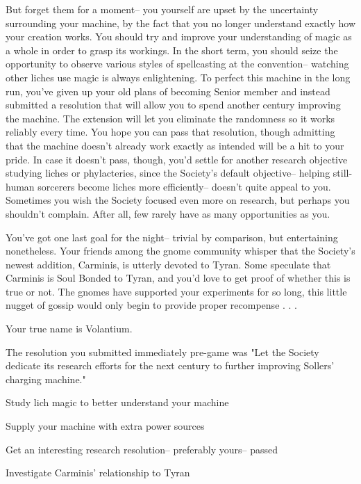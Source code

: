 \documentclass[char]{Sel}
\begin{document}
But forget them for a moment-- you yourself are upset by the uncertainty surrounding your machine, by the fact that you no longer understand exactly how your creation works. You should try and improve your understanding of magic as a whole in order to grasp its workings. In the short term, you should seize the opportunity to observe various styles of spellcasting at the convention-- watching other liches use magic is always enlightening. To perfect this machine in the long run, you've given up your old plans of becoming Senior member and instead submitted a resolution that will allow you to spend another century improving the machine. The extension will let you eliminate the randomness so it works reliably every time. You hope you can pass that resolution, though admitting that the machine doesn't already work exactly as intended will be a hit to your pride. In case it doesn't pass, though, you'd settle for another research objective studying liches or phylacteries, since the Society’s default objective-- helping still-human sorcerers become liches more efficiently-- doesn’t quite appeal to you. Sometimes you wish the Society focused even more on research, but perhaps you shouldn't complain. After all, few rarely have as many opportunities as you.

You've got one last goal for the night-- trivial by comparison, but entertaining nonetheless. Your friends among the gnome community whisper that the Society's newest addition, Carminis, is utterly devoted to Tyran. Some speculate that Carminis is Soul Bonded to Tyran, and you'd love to get proof of whether this is true or not. The gnomes have supported your experiments for so long, this little nugget of gossip would only begin to provide proper recompense . . .
\begin{itemz}[Notes]
  \item Your true name is Volantium.
  \item The resolution you submitted immediately pre-game was "Let the Society dedicate its research efforts for the next century to further improving Sollers' charging machine."
    \end{itemz}

 \begin{itemz}[Goals]
 \item Study lich magic to better understand your machine
\item Supply your machine with extra power sources
\item Get an interesting research resolution-- preferably yours-- passed
\item Investigate Carminis' relationship to Tyran
\end{itemz}
\end{document}
